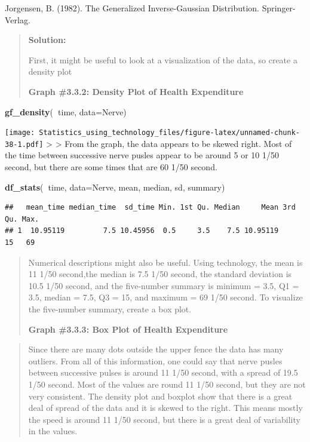 \documentclass[]{book}
\newenvironment{Shaded}{\begin{snugshade}}{\end{snugshade}}
\newcommand{\DataTypeTok}[1]{\textcolor[rgb]{0.13,0.29,0.53}{#1}}
\newcommand{\KeywordTok}[1]{\textcolor[rgb]{0.13,0.29,0.53}{\textbf{#1}}}
\newcommand{\NormalTok}[1]{#1}
\newcommand{\OperatorTok}[1]{\textcolor[rgb]{0.81,0.36,0.00}{\textbf{#1}}}
\begin{document}
Jorgensen, B. (1982). The Generalized Inverse-Gaussian Distribution. Springer-Verlag.

\begin{quote}
\textbf{Solution:}

First, it might be useful to look at a visualization of the data, so create a density plot

\textbf{Graph \#3.3.2: Density Plot of Health Expenditure}
\end{quote}

\begin{Shaded}
\begin{Highlighting}[]
\KeywordTok{gf_density}\NormalTok{(}\OperatorTok{~}\NormalTok{time, }\DataTypeTok{data=}\NormalTok{Nerve)}
\end{Highlighting}
\end{Shaded}

\texttt{[image: Statistics\_using\_technology\_files/figure-latex/unnamed-chunk-38-1.pdf]}
\textgreater{}
\textgreater{} From the graph, the data appears to be skewed right. Most of the time between successive nerve pusles appear to be around 5 or 10 1/50 second, but there are some times that are 60 1/50 second.

\begin{Shaded}
\begin{Highlighting}[]
\KeywordTok{df_stats}\NormalTok{(}\OperatorTok{~}\NormalTok{time, }\DataTypeTok{data=}\NormalTok{Nerve, mean, median, sd, summary)}
\end{Highlighting}
\end{Shaded}

\begin{verbatim}
##   mean_time median_time  sd_time Min. 1st Qu. Median     Mean 3rd Qu. Max.
## 1  10.95119         7.5 10.45956  0.5     3.5    7.5 10.95119      15   69
\end{verbatim}

\begin{quote}
Numerical descriptions might also be useful. Using technology, the mean is 11 1/50 second,the median is 7.5 1/50 second, the standard deviation is 10.5 1/50 second, and the five-number summary is minimum = 3.5, Q1 = 3.5, median = 7.5, Q3 = 15, and maximum = 69 1/50 second. To visualize the five-number summary, create a box plot.

\textbf{Graph \#3.3.3: Box Plot of Health Expenditure}
\end{quote}

\begin{quote}
Since there are many dots outside the upper fence the data has many outliers. From all of this information, one could say that nerve pusles between successive pulses is around 11 1/50 second, with a spread of 19.5 1/50 second. Most of the values are round 11 1/50 second, but they are not very consistent. The density plot and boxplot show that there is a great deal of spread of the data and it is skewed to the right. This means mostly the speed is around 11 1/50 second, but there is a great deal of variability in the values.
\end{quote}
\end{document}
